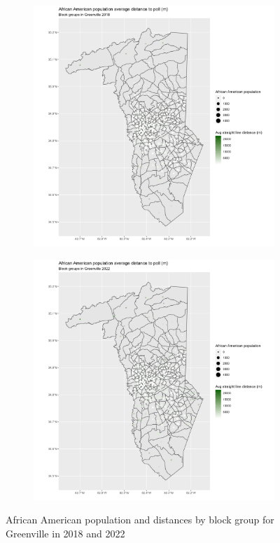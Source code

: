 \documentclass[11pt]{article}
\theoremstyle{remark}
\theoremstyle{definition}
\begin{document}
\begin{figure}
	\begin{subfigure}{.5\textwidth}
		\centering
		\includegraphics[width=\linewidth]{result analysis/Greenville_SC_original_configs/black_pop_and_dist_Greenville_config_original_2018_polls.png}
		\label{sfig:York_2018_bg_dist_pop}
	\end{subfigure}
	\begin{subfigure}{.5\textwidth}
		\centering
		\includegraphics[width=\linewidth]{result analysis/Greenville_SC_original_configs/black_pop_and_dist_Greenville_config_original_2022_polls.png}
		\label{sfig:Greenville_2022_bg_dist}
	\end{subfigure}
	\caption{African American population and distances by block group for Greenville in 2018 and 2022}
	\label{fig:Greenville distance Black population maps}
\end{figure}
\end{document}

